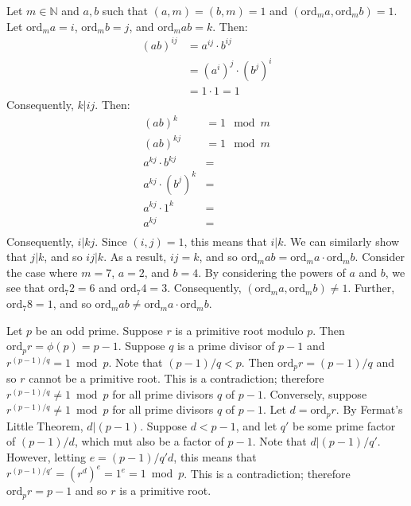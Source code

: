 \documentclass{article}
\begin{document}
\clearpage
\problem{}
Let $m \in \mathbb{N}$ and $a, b$ such that $(a, m) = (b, m) = 1$ and $(\mathrm{ord}_m a, \mathrm{ord}_m b) = 1$. Let $\mathrm{ord}_m a = i$, $\mathrm{ord}_m b = j$, and $\mathrm{ord}_m ab = k$. Then:
\begin{align*}
    {(ab)}^{ij} & = a^{ij} \cdot b^{ij} \\
    & = {(a^i)}^j \cdot {(b^j)}^i \\
    & = 1 \cdot 1 = 1
\end{align*}
Consequently, $k | ij$. Then:
\begin{align*}
    {(ab)}^k & = 1 \mod m \\
    {(ab)}^{kj} & = 1 \mod m \\
    a^{kj} \cdot b^{kj} & = \\
    a^{kj} \cdot {(b^j)}^k & = \\
    a^{kj} \cdot 1^k & = \\
    a^{kj} & = \\
\end{align*}
Consequently, $i | kj$. Since $(i, j) = 1$, this means that $i | k$. We can similarly show that $j | k$, and so $ij | k$. As a result, $ij = k$, and so $\mathrm{ord}_m ab = \mathrm{ord}_m a \cdot \mathrm{ord}_m b$.
Consider the case where $m = 7$, $a = 2$, and $b = 4$. By considering the powers of $a$ and $b$, we see that $\mathrm{ord}_7 2 = 6$ and $\mathrm{ord}_7 4 = 3$. Consequently, $(\mathrm{ord}_m a, \mathrm{ord}_m b) \neq 1$. Further, $\mathrm{ord}_7 8 = 1$, and so $\mathrm{ord}_m ab \neq \mathrm{ord}_m a \cdot \mathrm{ord}_m b$.

\clearpage
\problem{}
Let $p$ be an odd prime. Suppose $r$ is a primitive root modulo $p$. Then $\mathrm{ord}_p r = \phi(p) = p - 1$. Suppose $q$ is a prime divisor of $p - 1$ and $r^{(p - 1)/q} = 1 \bmod p$. Note that $(p - 1)/q < p$. Then $\mathrm{ord}_p r = (p - 1)/q$ and so $r$ cannot be a primitive root. This is a contradiction; therefore $r^{(p - 1)/q} \neq 1 \bmod p$ for all prime divisors $q$ of $p - 1$. Conversely, suppose $r^{(p - 1)/q} \neq 1 \bmod p$ for all prime divisors $q$ of $p - 1$. Let $d = \mathrm{ord}_p r$. By Fermat's Little Theorem, $d | (p - 1)$. Suppose $d < p - 1$, and let $q'$ be some prime factor of $(p - 1)/d$, which mut also be a factor of $p - 1$. Note that $d | (p - 1)/q'$. However, letting $e = (p - 1)/q'd$, this means that $r^{(p - 1)/q'} = {(r^d)}^e = 1^e = 1 \bmod p$. This is a contradiction; therefore $\mathrm{ord}_p r = p - 1$ and so $r$ is a primitive root.
\end{document}
